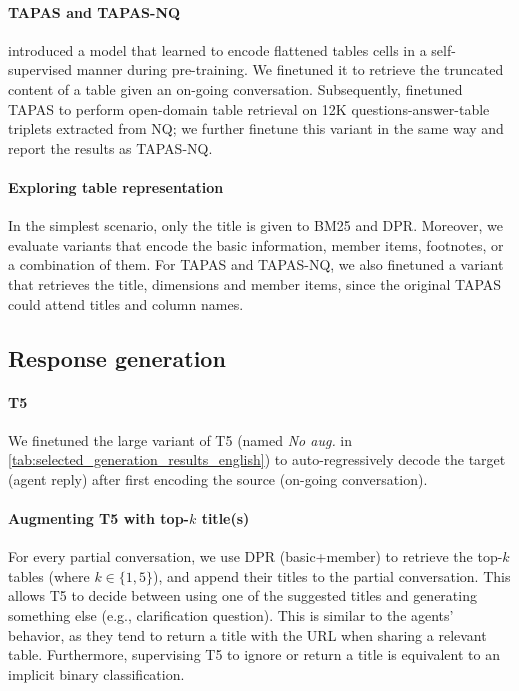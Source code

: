 \documentclass[11pt]{article}
\begin{document}
\paragraph{TAPAS and TAPAS-NQ} \citet{herzig_tapas_2020} introduced a model that learned to encode flattened tables cells in a self-supervised manner during pre-training. We finetuned it to retrieve the truncated content of a table given an on-going conversation. Subsequently, \citet{herzig_open_2021} finetuned TAPAS to perform open-domain table retrieval on 12K questions-answer-table triplets extracted from NQ; we further finetune this variant in the same way and report the results as TAPAS-NQ.

\paragraph{Exploring table representation} In the simplest scenario, only the title is given to BM25 and DPR. Moreover, we evaluate variants that encode the basic information, member items, footnotes, or a combination of them. For TAPAS and TAPAS-NQ, we also finetuned a variant that retrieves the title, dimensions and member items, since the original TAPAS could attend titles and column names.

\subsection{Response generation}

\paragraph{T5} We finetuned the large variant of T5 \citep{raffel_exploring_2020} (named \textit{No aug.} in \autoref{tab:selected_generation_results_english}) to auto-regressively decode the target (agent reply) after first encoding the source (on-going conversation).

\paragraph{Augmenting T5 with top-$k$ title(s)} For every partial conversation, we use DPR (basic+member) to retrieve the top-$k$ tables (where $k \in \{1, 5\}$), and append their titles to the partial conversation. This allows T5 to decide between using one of the suggested titles and generating something else (e.g., clarification question). This is similar to the agents' behavior, as they tend to return a title with the URL when sharing a relevant table. Furthermore, supervising T5 to ignore or return a title is equivalent to an implicit binary classification.
\end{document}
